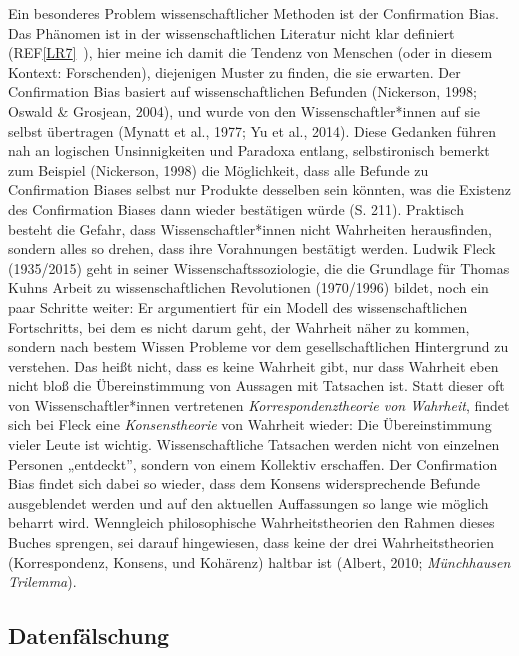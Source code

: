 \documentclass[
  letterpaper,
  DIV=11,
  numbers=noendperiod]{scrreprt}
\begin{document}
Ein besonderes Problem wissenschaftlicher Methoden ist der Confirmation
Bias. Das Phänomen ist in der wissenschaftlichen Literatur nicht klar
definiert (REF\hyperref[_msocom_7]{{[}LR7{]}}~), hier meine ich damit
die Tendenz von Menschen (oder in diesem Kontext: Forschenden),
diejenigen Muster zu finden, die sie erwarten. Der Confirmation Bias
basiert auf wissenschaftlichen Befunden (Nickerson, 1998; Oswald \&
Grosjean, 2004), und wurde von den Wissenschaftler*innen auf sie selbst
übertragen (Mynatt et al., 1977; Yu et al., 2014). Diese Gedanken führen
nah an logischen Unsinnigkeiten und Paradoxa entlang, selbstironisch
bemerkt zum Beispiel (Nickerson, 1998) die Möglichkeit, dass alle
Befunde zu Confirmation Biases selbst nur Produkte desselben sein
könnten, was die Existenz des Confirmation Biases dann wieder bestätigen
würde (S. 211). Praktisch besteht die Gefahr, dass Wissenschaftler*innen
nicht Wahrheiten herausfinden, sondern alles so drehen, dass ihre
Vorahnungen bestätigt werden. Ludwik Fleck (1935/2015) geht in seiner
Wissenschaftssoziologie, die die Grundlage für Thomas Kuhns Arbeit zu
wissenschaftlichen Revolutionen (1970/1996) bildet, noch ein paar
Schritte weiter: Er argumentiert für ein Modell des wissenschaftlichen
Fortschritts, bei dem es nicht darum geht, der Wahrheit näher zu kommen,
sondern nach bestem Wissen Probleme vor dem gesellschaftlichen
Hintergrund zu verstehen. Das heißt nicht, dass es keine Wahrheit gibt,
nur dass Wahrheit eben nicht bloß die Übereinstimmung von Aussagen mit
Tatsachen ist. Statt dieser oft von Wissenschaftler*innen vertretenen
\emph{Korrespondenztheorie von Wahrheit}, findet sich bei Fleck eine
\emph{Konsenstheorie} von Wahrheit wieder: Die Übereinstimmung vieler
Leute ist wichtig. Wissenschaftliche Tatsachen werden nicht von
einzelnen Personen „entdeckt'', sondern von einem Kollektiv erschaffen.
Der Confirmation Bias findet sich dabei so wieder, dass dem Konsens
widersprechende Befunde ausgeblendet werden und auf den aktuellen
Auffassungen so lange wie möglich beharrt wird. Wenngleich
philosophische Wahrheitstheorien den Rahmen dieses Buches sprengen, sei
darauf hingewiesen, dass keine der drei Wahrheitstheorien
(Korrespondenz, Konsens, und Kohärenz) haltbar ist (Albert, 2010;
\emph{Münchhausen Trilemma}).

\subsection{Datenfälschung}\label{datenfuxe4lschung}
\end{document}
